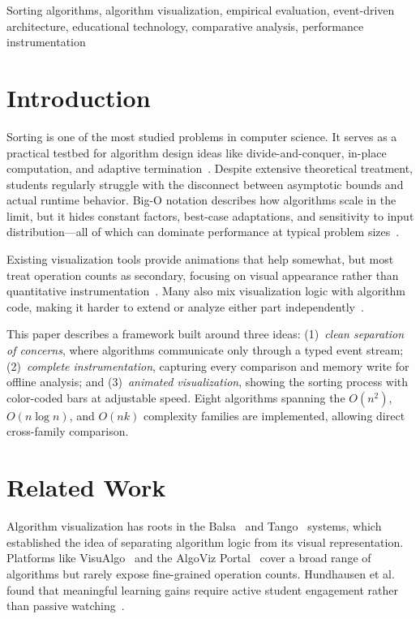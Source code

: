 \documentclass[conference]{IEEEtran}
\begin{document}
\begin{IEEEkeywords}
Sorting algorithms, algorithm visualization, empirical evaluation,
event-driven architecture, educational technology, comparative analysis,
performance instrumentation
\end{IEEEkeywords}

\section{Introduction}

Sorting is one of the most studied problems in computer science. It serves as a
practical testbed for algorithm design ideas like divide-and-conquer, in-place
computation, and adaptive termination~\cite{cormen2009,knuth1998}. Despite
extensive theoretical treatment, students regularly struggle with the disconnect
between asymptotic bounds and actual runtime behavior. Big-O notation describes
how algorithms scale in the limit, but it hides constant factors, best-case
adaptations, and sensitivity to input distribution---all of which can dominate
performance at typical problem sizes~\cite{bentley2000,sedgewick2011}.

Existing visualization tools provide animations that help somewhat, but most
treat operation counts as secondary, focusing on visual appearance rather than
quantitative instrumentation~\cite{stasko1998,sorva2012}. Many also mix
visualization logic with algorithm code, making it harder to extend or analyze
either part independently~\cite{hundhausen2002,naps2002}.

This paper describes a framework built around three ideas: (1)~\emph{clean
separation of concerns}, where algorithms communicate only through a typed event
stream; (2)~\emph{complete instrumentation}, capturing every comparison and
memory write for offline analysis; and (3)~\emph{animated visualization},
showing the sorting process with color-coded bars at adjustable speed. Eight algorithms spanning the $O(n^2)$,
$O(n \log n)$, and $O(nk)$ complexity families are implemented, allowing direct
cross-family comparison.

\section{Related Work}

Algorithm visualization has roots in the Balsa~\cite{brown1984} and
Tango~\cite{stasko1990} systems, which established the idea of separating
algorithm logic from its visual representation. Platforms like
VisuAlgo~\cite{halim2012} and the AlgoViz Portal~\cite{shaffer2010} cover a
broad range of algorithms but rarely expose fine-grained operation counts.
Hundhausen et al.~\cite{hundhausen2002} found that meaningful learning gains
require active student engagement rather than passive
watching~\cite{naps2002}.
\end{document}
